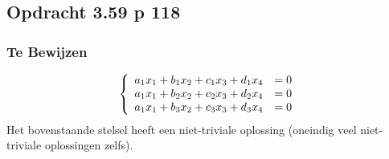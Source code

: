 \documentclass[lineaire_algebra_oplossingen.tex]{subfiles}
\begin{document}
%



\subsection{Opdracht 3.59 p 118}
\label{3.59}
\subsubsection*{Te Bewijzen}
\[
\left\lbrace
\begin{array}{c c}
a_1x_1 + b_1x_2 + c_1x_3 + d_1x_4 &= 0 \\
a_1x_1 + b_2x_2+ c_2x_3 + d_2x_4 &= 0 \\
a_1x_1 + b_3x_2+ c_3x_3 + d_3x_4 &= 0 \\
\end{array}
\right.
\]
Het bovenstaande stelsel heeft een niet-triviale oplossing (oneindig veel niet-triviale oplossingen zelfs).
\end{document}
